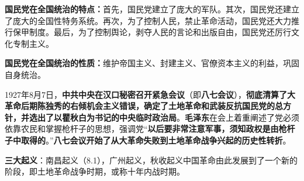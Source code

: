 \textbf{国民党在全国统治的特点：}首先，国民党建立了庞大的军队。其次，国民党还建立了庞大的全国性特务系统。再次，为了控制人民，禁止革命活动，国民党还大力推行保甲制度。最后，为了控制舆论，剥夺人民的言论和出版自由，国民党还厉行文化专制主义。{}

\textbf{国民党在全国统治的性质：}维护帝国主义、封建主义、官僚资本主义的利益，巩固自身统治。{}

{1927}年{8}月{7}日，\textbf{中共中央在汉口秘密召开紧急会议}（即\textbf{{八七会议}}），\textbf{彻底清算了大革命后期陈独秀的右倾机会主义错误，确定了土地革命和武装反抗国民党的总方针，并选出了以瞿秋白为书记的中央临时政治局}。\textbf{毛泽东}在会上着重阐述了党必须依靠农民和掌握枪杆子的思想，强调党{``}\textbf{以后要非常注意军事，须知政权是由枪杆子中取得的}。{''}\textbf{八七会议开始了从大革命失败到土地革命战争兴起的{历史性转折}}。

\textbf{三大起义}{：南昌起义（8.1），广州起义，秋收起义中国革命由此发展到了一个新的阶段，即}土地革命战争{时期，或称}十年内战时期{。}
